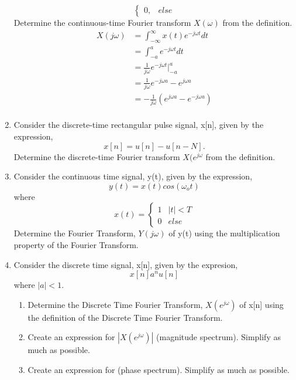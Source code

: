 \documentclass{article}
\begin{document}
\begin{enumerate}
\begin{equation}
\begin{cases}
        0, & else
        \end{cases}
    \end{equation}
    Determine the continuous-time Fourier transform $X(\omega)$ from the definition.
    \begin{align}
        X(j\omega) &= \int_{-\infty}^\infty x(t) e^{-j\omega t}dt\\
        &= \int_{-a}^a e^{-j\omega t}dt\\
        &= \frac{1}{j\omega} e^{-j\omega t}\bigg|_{-a}^a\\
        &= \frac{1}{j\omega} e^{-j\omega a}-e^{j\omega a}\\
        &= -\frac{1}{j\omega} (e^{j\omega a}-e^{-j\omega a})\\
    \end{align}
    \newpage
    \item Consider the discrete-time rectangular pulse signal, x[n], given by the expression,
    \begin{equation}
        x[n] = u[n] -u[n-N].
    \end{equation}
    Determine the discrete-time Fourier transform $X(e^{j\omega}$ from the definition.
    \item Consider the  continuous time signal, y(t), given by the expression,
    \begin{equation}
        y(t) = x(t)cos(\omega_ot)
    \end{equation}
    where
    \begin{equation}
        x(t) = \begin{cases}
        1 & |t| < T\\
        0 & else
        \end{cases}
    \end{equation}
    Determine the Fourier Transform, $Y(j\omega)$ of y(t) using the multiplication property of the Fourier Transform.
    \item Consider the discrete time signal, x[n], given by the expresion,
    \begin{equation}
        x[n] a^nu[n] 
    \end{equation}
    where $|a| < 1$.
    \begin{enumerate}
        \item Determine the Discrete Time Fourier Transform, $X(e^{j\omega})$ of x[n] using the definition of the Discrete Time Fourier Transform.
        \item Create an expression for $|X(e^{j\omega})|$ (magnitude spectrum). Simplify as much as possible.
        \item Create an expression for  (phase spectrum). Simplify as much as possible.
    \end{enumerate}
\end{enumerate}
\end{document}
